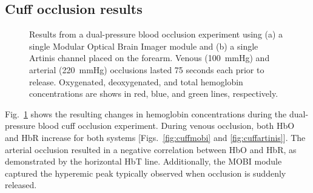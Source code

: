 \subsection{Cuff occlusion results}
\begin{figure}
	\begin{center}
	\end{center}
	\caption{Results from a dual-pressure blood occlusion experiment using (a) a single Modular Optical Brain Imager module and (b) a single Artinis channel placed on the forearm. Venous (100~mmHg) and arterial (220~mmHg) occlusions lasted 75 seconds each prior to release. Oxygenated, deoxygenated, and total hemoglobin concentrations are shows in red, blue, and green lines, respectively.} 
	\label{fig:cuff}
\end{figure} 
Fig.~\ref{fig:cuff} shows the resulting changes in hemoglobin concentrations during the dual-pressure blood cuff occlusion experiment. During venous occlusion, both \ac{HbO} and \ac{HbR} increase for both systems [Figs.~\ref{fig:cuffmobi} and \ref{fig:cuffartinis}]. The arterial occlusion resulted in a negative correlation between \ac{HbO} and \ac{HbR}, as demonstrated by the horizontal \ac{HbT} line. Additionally, the \ac{MOBI} module captured the hyperemic peak typically observed when occlusion is suddenly released. 


